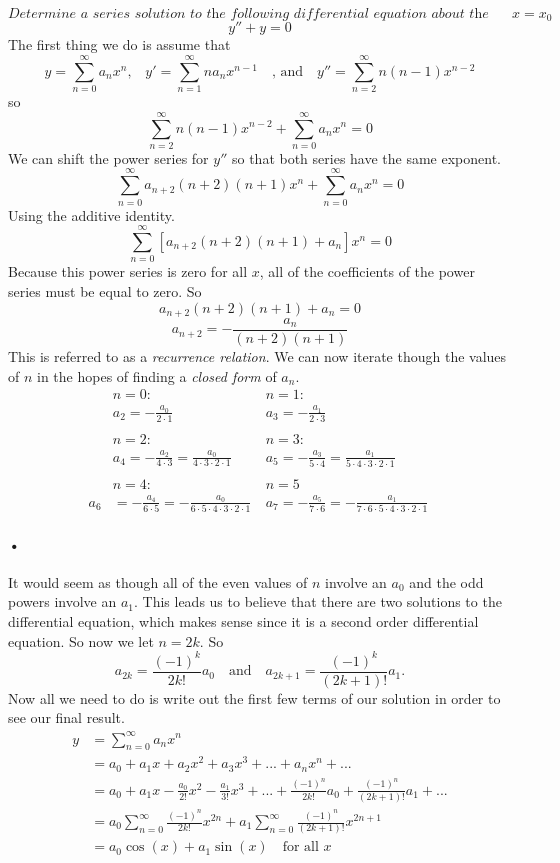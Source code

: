 \documentclass[font =22]{report}
\begin{document}
\[
\textit{Determine a series solution to the following differential equation about the point }x=x_0 	
\]
\[
y''+y = 0
\]
The first thing we do is assume that 
\[
y=\sum_{n=0}^\infty a_nx^n \text{,}\quad y'= \sum_{n=1}^\infty na_nx^{n-1} \quad \text{, and} \quad y''= \sum_{n=2}^\infty n(n-1)x^{n-2}
\]
so
\[
\sum_{n=2}^\infty n(n-1)x^{n-2} + \sum_{n=0}^\infty a_nx^n = 0
\]
We can shift the power series for $y''$ so that both series have the same exponent.
\[
\sum_{n=0}^\infty a_{n+2}(n+2)(n+1)x^n + \sum_{n=0}^\infty a_nx^n = 0
\]
Using the additive identity.
\[
\sum_{n=0}^\infty [a_{n+2}(n+2)(n+1) + a_n]x^n = 0
\]
Because this power series is zero for all $x$, all of the coefficients of the power series must be equal to zero. So 
\[
a_{n+2}(n+2)(n+1) + a_n = 0
\]
\[
a_{n+2} = - \frac{a_n}{(n+2)(n+1)}
\] 
This is referred to as a \textit{recurrence relation}. We can now iterate though the values of $n$ in the hopes of finding a \textit{closed form} of $a_n$.
\begin{align*}
&n=0: \ &n=1:\ 
\\ &a_2 = - \frac{a_0}{2\cdot1}  \ &a_3 = -\frac{a_1}{2\cdot3} \ 
\\ \\
&n= 2: \ &n=3: \
\\&a_4 = -\frac{a_2}{4\cdot3} = \frac{a_0}{4\cdot3\cdot2\cdot1} \ &a_5 = -\frac{a_3}{5\cdot4} = \frac{a_1}{5\cdot4\cdot3\cdot2\cdot1} \
\\ \\
&n=4: \  &n=5 \
\\
a_6 &= -\frac{a_4}{6\cdot5} = -\frac{a_0}{6\cdot5\cdot4\cdot3\cdot2\cdot1}
\ &a_7=-\frac{a_5}{7\cdot6}=-\frac{a_1}{7\cdot6\cdot5\cdot4\cdot3\cdot2\cdot1} \
\end{align*}
\paragraph{•}
It would seem as though all of the even values of $n$ involve an $a_0$ and the odd powers involve an $a_1$. This leads us to believe that there are two solutions to the differential equation, which makes sense since it is a second order differential equation. So now we let $n = 2k$. So
\[
a_{2k} = \frac{(-1)^k}{2k!}a_0 \quad \text{and} \quad a_{2k+1} = \frac{(-1)^k}{(2k+1)!}a_1.
\]
Now all we need to do is write out the first few terms of our solution in order to see our final result.
\begin{align*}
y&=\sum_{n=0}^\infty a_nx^n 
\\
&= a_0+a_1x+a_2x^2+a_3x^3+...+a_nx^n+...
\\
&= a_0 +a_1x-\frac{a_0}{2!}x^2-\frac{a_1}{3!}x^3+...+\frac{(-1)^n}{2k!}a_0+\frac{(-1)^n}{(2k+1)!}a_1+...
\\
&= a_0\sum_{n=0}^\infty\frac{(-1)^n}{2k!}x^{2n} + a_1\sum_{n=0}^\infty \frac{(-1)^n}{(2k+1)!}x^{2n+1}
\\
&= a_0\cos(x) + a_1\sin(x) \quad \text{for all }x 
\end{align*}
\end{document}
